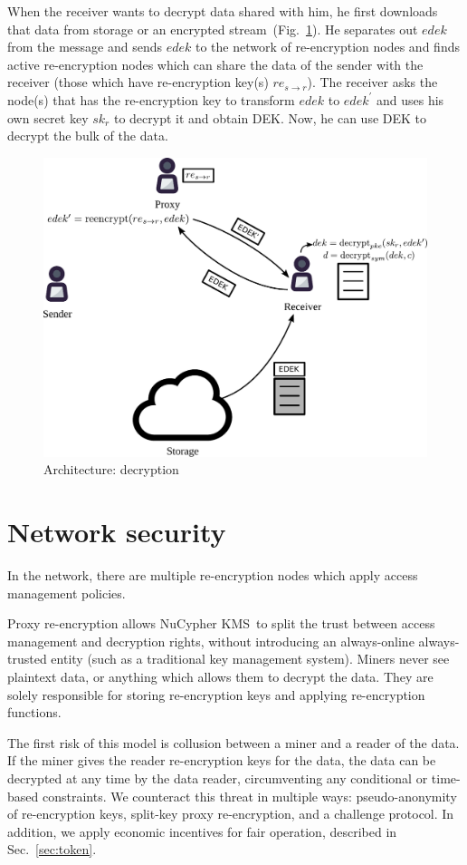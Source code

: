 \documentclass[longbibliography,nofootinbib]{revtex4-1}
\newcommand{\kms}{NuCypher KMS}
\newcommand{\figref}[1]{Fig.~\ref{#1}}
\begin{document}
When the receiver wants to decrypt data shared with him, he first downloads that data from storage or an encrypted stream~(\figref{fig:arch-decrypt}).
He separates out $edek$ from the message and sends $edek$ to the network of re-encryption nodes and finds active re-encryption nodes which can share the data
of the sender with the receiver (those which have re-encryption key(s) $re_{s\rightarrow r}$).
The receiver asks the node(s) that has the re-encryption key to transform $edek$ to $edek^{\prime}$ and uses his own secret key $sk_r$ to decrypt it and
obtain DEK.
Now, he can use DEK to decrypt the bulk of the data.
\begin{figure}
\centering
    \includegraphics[width=0.6\columnwidth]{pdf/decrypt.pdf}
    \caption{Architecture: decryption}
    \label{fig:arch-decrypt}
\end{figure}

\section{Network security}

In the network, there are multiple re-encryption nodes which apply access management policies.

Proxy re-encryption allows \kms~to split the trust between access management and decryption rights,
without introducing an always-online always-trusted entity (such as a traditional key management system).
Miners never see plaintext data, or anything which allows them to decrypt the data.
They are solely responsible for storing re-encryption keys and applying re-encryption functions.

The first risk of this model is collusion between a miner and a reader of the data.
If the miner gives the reader re-encryption keys for the data,
the data can be decrypted at any time by the data reader, circumventing any conditional or time-based constraints.
We counteract this threat in multiple ways: pseudo-anonymity of re-encryption keys, split-key proxy re-encryption, and a challenge protocol.
In addition, we apply economic incentives for fair operation, described in Sec.~\ref{sec:token}.
\end{document}

